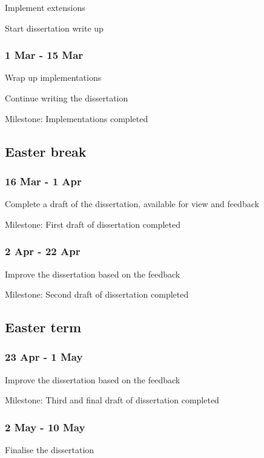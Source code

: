 \documentclass[12pt,a4paper,twoside]{article}
\begin{document}
Implement extensions

Start dissertation write up

\subsubsection*{1 Mar - 15 Mar}

Wrap up implementations

Continue writing the dissertation

Milestone: Implementations completed

\subsection*{Easter break}

\subsubsection*{16 Mar - 1 Apr}

Complete a draft of the dissertation, available for view and feedback

Milestone: First draft of dissertation completed

\subsubsection*{2 Apr - 22 Apr}

Improve the dissertation based on the feedback

Milestone: Second draft of dissertation completed

\subsection*{Easter term}

\subsubsection*{23 Apr - 1 May}

Improve the dissertation based on the feedback

Milestone: Third and final draft of dissertation completed

\subsubsection*{2 May - 10 May}

Finalise the dissertation
\end{document}
